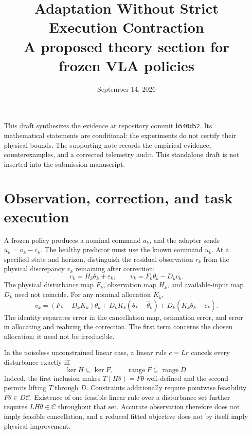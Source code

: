 \documentclass[11pt]{article}
\title{Adaptation Without Strict Execution Contraction\\
\large A proposed theory section for frozen VLA policies}
\author{}
\date{September 14, 2026}
\begin{document}
\maketitle

\noindent
This draft synthesizes the evidence at repository commit \texttt{b540d52}.
Its mathematical statements are conditional; the experiments do not certify
their physical bounds. The supporting note records the empirical evidence,
counterexamples, and a corrected telemetry audit. This standalone draft is
not inserted into the submission manuscript.

\section{Observation, correction, and task execution}
A frozen policy produces a nominal command $a_k$, and the adapter sends
$u_k=a_k-c_k$. The healthy predictor must use the known command $u_k$.
At a specified state and horizon, distinguish the residual observation
$r_k$ from the physical discrepancy $v_k$ remaining after correction:
\begin{equation}
 r_k=H_k\theta_k+\varepsilon_k,\qquad
 v_k=F_k\theta_k-D_kc_k.
 \label{eq:maps}
\end{equation}
The physical disturbance map $F_k$, observation map $H_k$, and available-input
map $D_k$ need not coincide. For any nominal allocation $K_k$,
\begin{equation}
 v_k=(F_k-D_kK_k)\theta_k+
 D_kK_k(\theta_k-\hat\theta_k)+D_k(K_k\hat\theta_k-c_k).
 \label{eq:decomposition}
\end{equation}
The identity separates error in the cancellation map, estimation error,
and error in allocating and realizing the correction.
The first term concerns the chosen allocation; it need not be irreducible.

In the noiseless unconstrained linear case, a linear rule $c=Lr$ cancels
every disturbance exactly iff
\begin{equation}
 \ker H\subseteq\ker F,\qquad
 \operatorname{range}F\subseteq\operatorname{range}D.
\end{equation}
Indeed, the first inclusion makes $T(H\theta)=F\theta$ well-defined and the
second permits lifting $T$ through $D$. Constraints additionally require
pointwise feasibility $F\theta\in D\mathcal C$. Existence of one feasible
linear rule over a disturbance set further requires $LH\theta\in\mathcal C$
throughout that set. Accurate observation therefore does not imply feasible
cancellation, and a reduced fitted objective does not by itself imply
physical improvement.
\end{document}
